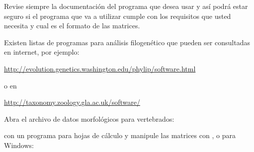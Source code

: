 Revise siempre la documentaci\'on del programa que desea usar y as\'i podr\'a estar seguro si el programa que va a utilizar cumple con los requisitos que usted necesita y cual es el formato de las matrices.

Existen listas de programas para an\'alisis filogen\'etico que pueden ser consultadas en internet, por ejemplo:


\url{http://evolution.genetics.washington.edu/phylip/software.html}
 
o en 

\url{http://taxonomy.zoology.gla.ac.uk/software/}


Abra el archivo de datos morfol\'ogicos para vertebrados: 


con un programa para hojas de c\'alculo y manipule las matrices con , 
 o  para Windows:

